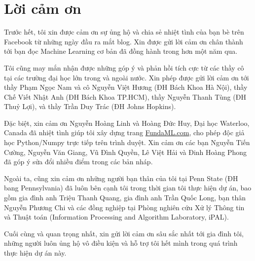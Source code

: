 



\section{Lời cảm ơn}
Trước hết, tôi xin được cảm ơn sự ủng hộ và chia sẻ nhiệt tình của bạn bè trên  Facebook từ những ngày đầu ra mắt blog. Xin được gửi lời cảm ơn chân thành tới bạn đọc Machine Learning cơ bản đã đồng hành trong hơn một năm qua. 

Tôi cũng may mắn nhận được những góp ý và phản hồi tích cực từ các thầy cô
tại các trường đại học lớn trong và ngoài nước. Xin phép được gửi lời cảm ơn
tới thầy Phạm Ngọc Nam và cô Nguyễn Việt Hương (ĐH Bách Khoa Hà Nội), thầy Chế
Viết Nhật Anh (ĐH Bách Khoa TP.HCM), thầy Nguyễn Thanh Tùng (ĐH Thuỷ Lợi),
và thầy Trần Duy Trác (ĐH Johns Hopkins).

Đặc biệt, xin cảm ơn Nguyễn Hoàng Linh và Hoàng Đức Huy, Đại học Waterloo,
Canada đã nhiệt tình giúp tôi xây dựng trang \url{FundaML.com}, cho phép độc giả
 học Python/Numpy trực tiếp trên trình duyệt. Xin cảm ơn các bạn Nguyễn
Tiến Cường, Nguyễn Văn Giang, Vũ Đình Quyền, Lê Việt Hải và Đinh Hoàng Phong đã
góp ý sửa đổi nhiều điểm trong các bản nháp.

Ngoài ta, cũng xin cảm ơn những người bạn thân của tôi tại Penn State
(ĐH bang Pennsylvania) đã luôn bên cạnh tôi trong thời gian tôi thực hiện dự án,
bao gồm gia đình anh Triệu Thanh Quang, gia đình anh Trần Quốc Long, bạn thân
Nguyễn Phương Chi và các đồng nghiệp tại Phòng nghiên cứu Xử lý Thông tin và
Thuật toán (Information Processing and Algorithm Laboratory, iPAL).

Cuối cùng và quan trọng nhất, xin gửi lời cảm ơn sâu sắc nhất tới gia đình tôi,
những người luôn ủng hộ vô điều kiện và hỗ trợ tôi hết mình trong quá trình thực
hiện dự án này.





